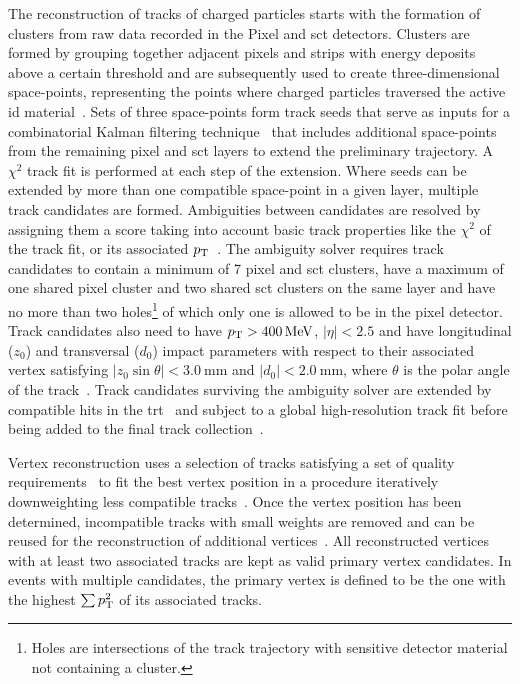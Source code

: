 The reconstruction of tracks of charged particles starts with the formation of clusters from raw data recorded in the Pixel and \gls{sct} detectors. Clusters are formed by grouping together adjacent pixels and strips with energy deposits above a certain threshold and are subsequently used to create three-dimensional space-points, representing the points where charged particles traversed the active \gls{id} material~\cite{PERF-2015-08}. Sets of three space-points form track seeds that serve as inputs for a combinatorial Kalman filtering technique~\cite{Fruhwirth:178627} that includes additional space-points from the remaining pixel and \gls{sct} layers to extend the preliminary trajectory. A $\chi^2$ track fit is performed at each step of the extension. Where seeds can be extended by more than one compatible space-point in a given layer, multiple track candidates are formed. Ambiguities between candidates are resolved by assigning them a score taking into account basic track properties like the $\chi^2$ of the track fit, or its associated $p_{\textrm{T}}$~\cite{PERF-2015-08}. The ambiguity solver requires track candidates to contain a minimum of 7 pixel and \gls{sct} clusters, have a maximum of one shared pixel cluster and two shared \gls{sct} clusters on the same layer and have no more than two holes\footnote{Holes are intersections of the track trajectory with sensitive detector material not containing a cluster.} of which only one is allowed to be in the pixel detector. Track candidates also need to have $\pt > \SI{400}{\MeV}$, $\vert\eta\vert < 2.5$ and have longitudinal ($z_0$) and transversal ($d_0$) impact parameters with respect to their associated vertex satisfying $\vert z_0 \sin\theta \vert < \SI{3.0}{\milli\meter}$ and $\vert d_0 \vert < \SI{2.0}{\milli\meter}$, where $\theta$ is the polar angle of the track~\cite{PERF-2015-08}. Track candidates surviving the ambiguity solver are extended by compatible hits in the \gls{trt}~\cite{Cornelissen:1176900} and subject to a global high-resolution track fit before being added to the final track collection~\cite{PERF-2015-08}.

Vertex reconstruction uses a selection of tracks satisfying a set of quality requirements~\cite{ATL-PHYS-PUB-2015-026} to fit the best vertex position in a procedure iteratively downweighting less compatible tracks~\cite{PERF-2015-01}. Once the vertex position has been determined, incompatible tracks with small weights are removed and can be reused for the reconstruction of additional vertices~\cite{PERF-2015-01}. All reconstructed vertices with at least two associated tracks are kept as valid primary vertex candidates. In events with multiple candidates, the primary vertex is defined to be the one with the highest $\sum p_{\textrm{T}}^2$ of its associated tracks.

